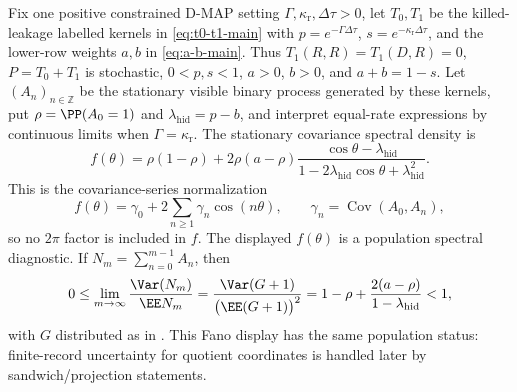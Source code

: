 \begin{proposition}\label{prop:spectrum-main}
Fix one positive constrained D-MAP setting
\(\Gamma,\kappa_{\mathrm r},\Delta\tau>0\), let \(T_0,T_1\) be the
killed-leakage labelled kernels in \eqref{eq:t0-t1-main} with
\(p=e^{-\Gamma\Delta\tau}\), \(s=e^{-\kappa_{\mathrm r}\Delta\tau}\), and
the lower-row weights \(a,b\) in \eqref{eq:a-b-main}.  Thus
\(T_1(R,R)=T_1(D,R)=0\), \(P=T_0+T_1\) is stochastic, \(0<p,s<1\),
\(a>0\), \(b>0\), and \(a+b=1-s\).  Let
\((A_n)_{n\in\mathbb Z}\) be the stationary visible binary process generated
by these kernels, put \(\rho=\PP(A_0=1)\) and
\(\lambda_{\mathrm{hid}}=p-b\), and interpret equal-rate expressions by
continuous limits when \(\Gamma=\kappa_{\mathrm r}\).  The stationary
covariance spectral density is
\begin{equation}\label{eq:spectrum-main}
f(\theta)=
\rho(1-\rho)+
2\rho(a-\rho)
\frac{\cos\theta-\lambda_{\mathrm{hid}}}
     {1-2\lambda_{\mathrm{hid}}\cos\theta+\lambda_{\mathrm{hid}}^2}.
\end{equation}
This is the covariance-series normalization
\[
f(\theta)=\gamma_0+2\sum_{n\ge1}\gamma_n\cos(n\theta),
\qquad
\gamma_n=\operatorname{Cov}(A_0,A_n),
\]
so no \(2\pi\) factor is included in \(f\).
The displayed \(f(\theta)\) is a population spectral diagnostic.
If \(N_m=\sum_{n=0}^{m-1}A_n\), then
\begin{equation}\label{eq:fano-main}
0\le
\lim_{m\to\infty}\frac{\Var(N_m)}{\EE N_m}
=\frac{\Var(G+1)}{\bigl(\EE(G+1)\bigr)^2}
=1-\rho+\frac{2(a-\rho)}{1-\lambda_{\mathrm{hid}}}
<1,
\end{equation}
with \(G\) distributed as in .
This Fano display has the same population status: finite-record uncertainty
for quotient coordinates is handled later by sandwich/projection statements.
\end{proposition}

